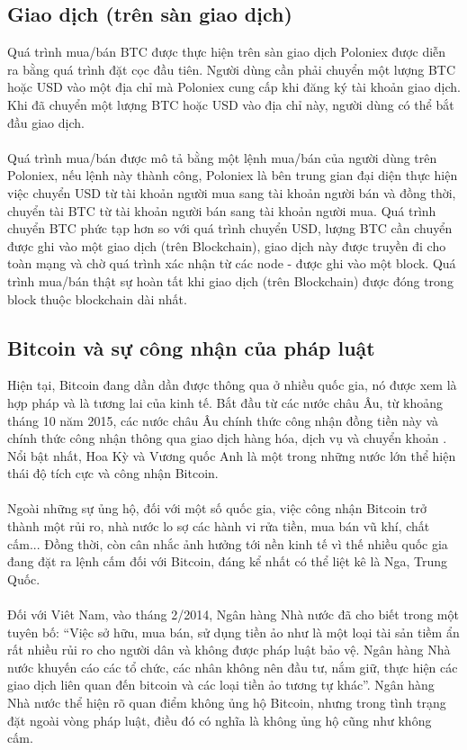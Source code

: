 \subsection{Giao dịch (trên sàn giao dịch)}
Quá trình mua/bán BTC được thực hiện trên sàn giao dịch Poloniex được diễn ra 
bằng quá trình đặt cọc đầu tiên. Người dùng cần phải chuyển một lượng BTC hoặc 
USD vào một địa chỉ mà Poloniex cung cấp khi đăng ký tài khoản giao dịch. Khi 
đã chuyển một lượng BTC hoặc USD vào địa chỉ này, người dùng có thể bắt đầu 
giao dịch.\\\\
Quá trình mua/bán được mô tả bằng một lệnh mua/bán của người dùng trên Poloniex, 
nếu lệnh này thành công, Poloniex là bên trung gian đại diện thực hiện việc chuyển 
USD từ tài khoản người mua sang tài khoản người bán và đồng thời, chuyển tài BTC 
từ tài khoản người bán sang tài khoản người mua. Quá trình chuyển BTC phức tạp 
hơn so với quá trình chuyển USD, lượng BTC cần chuyển được ghi vào một giao dịch 
(trên Blockchain), giao dịch này được truyền đi cho toàn mạng và chờ quá trình 
xác nhận từ các node - được ghi vào một block. Quá trình mua/bán thật sự hoàn 
tất khi giao dịch (trên Blockchain) được đóng trong block thuộc blockchain dài 
nhất.
\subsection{Bitcoin và sự công nhận của pháp luật}
Hiện tại, Bitcoin đang dần dần được thông qua ở nhiều quốc gia, nó được xem là 
hợp pháp và là tương lai của kinh tế. Bắt đầu từ các nước châu Âu, từ khoảng 
tháng 10 năm 2015, các nước châu Âu chính thức công nhận đồng tiền này và chính 
thức công nhận thông qua giao dịch hàng hóa, dịch vụ và chuyển khoản \cite{LawBitcoin}.
Nổi bật nhất, Hoa Kỳ và Vương quốc Anh là một trong những nước lớn thể hiện thái 
độ tích cực và công nhận Bitcoin.\\\\
Ngoài những sự ủng hộ, đối với một số quốc gia, việc công nhận Bitcoin trở thành 
một rủi ro, nhà nước lo sợ các hành vi rửa tiền, mua bán vũ khí, chất cấm... 
Đồng thời, còn cân nhắc ảnh hưởng tới nền kinh tế vì thế nhiều quốc gia đang 
đặt ra lệnh cấm đối với Bitcoin, đáng kể nhất có thể liệt kê là Nga, Trung Quốc.\\\\
Đối với Viêt Nam, vào tháng 2/2014, Ngân hàng Nhà nước đã cho biết trong một 
tuyên bố: ``Việc sở hữu, mua bán, sử dụng tiền ảo như là một loại tài sản tiềm 
ẩn rất nhiều rủi ro cho người dân và không được pháp luật bảo vệ. Ngân hàng Nhà 
nước khuyến cáo các tổ chức, các nhân không nên đầu tư, nắm giữ, thực hiện các 
giao dịch liên quan đến bitcoin và các loại tiền ảo tương tự khác''. Ngân hàng 
Nhà nước thể hiện rõ quan điểm không ủng hộ Bitcoin, nhưng trong tình trạng đặt 
ngoài vòng pháp luật, điều đó có nghĩa là không ủng hộ cũng như không cấm.
